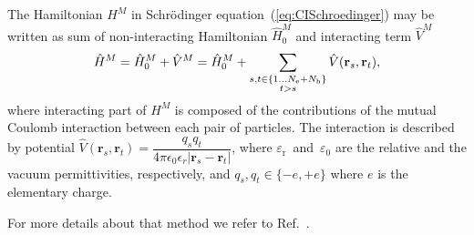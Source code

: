 The Hamiltonian $H^M$ in Schrödinger equation~(\ref{eq:CISchroedinger}) may be written as sum of non-interacting Hamiltonian $\hat{H}_0^M$ and interacting term $\hat{V}^M$
%
\begin{equation}
\hat{H} ^M= \hat{H}_0^M + \hat{V}^M = \hat{H} _0^M + \sum_{\substack{s, t \in \{1 \ldots N_{{\rm{e}}}+N_{{\rm{h}}} \}\\t>s} } \hat{V}(\mathbf{r}_s,\mathbf{r}_t), 
\end{equation}
%
where interacting part of $H^M$ is composed of the contributions of the mutual Coulomb interaction between each pair of particles. The interaction is described by potential $\hat{V}(\mathbf{r}_s,\mathbf{r}_t)=\dfrac{q_sq_t}{4\pi \epsilon_0\epsilon_r |\mathbf{r}_s - \mathbf{r}_t|}$, where $\varepsilon_\mathrm{r}$~and~$\varepsilon_0$ are the relative and the vacuum permittivities, respectively, and $q_s,q_t\in\{-e,+e\}$ where $e$ is the elementary charge.

For more details about that method we refer to Ref.~\citep{Klenovsky2017}.


\newpage

\newpage 